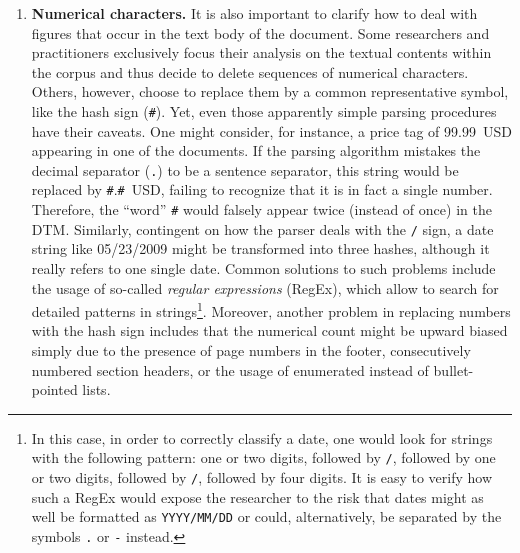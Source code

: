 \begin{enumerate}[(1)]
\item \textbf{Numerical characters.} It is also important to clarify how to deal with figures that occur in the text body of the document. Some researchers and practitioners exclusively focus their analysis on the textual contents within the corpus and thus decide to delete sequences of numerical characters. Others, however, choose to replace them by a common representative symbol, like the hash sign (\texttt{\#}). Yet, even those apparently simple parsing procedures have their caveats. One might consider, for instance, a price tag of \mbox{\textsf{99.99 USD}} appearing in one of the documents. If the parsing algorithm mistakes the decimal separator (\texttt{.}) to be a sentence separator, this string would be replaced by \mbox{\texttt{\#}.\texttt{\#} \textsf{USD}}, failing to recognize that it is in fact a single number. Therefore, the \enquote{word} \texttt{\#} would falsely appear twice (instead of once) in the DTM. Similarly, contingent on how the parser deals with the \texttt{/} sign, a date string like \textsf{05/23/2009} might be transformed into three hashes, although it really refers to one single date. Common solutions to such problems include the usage of so-called \emph{regular expressions} (RegEx), which allow to search for detailed patterns in strings\footnote{In this case, in order to correctly classify a date, one would look for strings with the following pattern: one or two digits, followed by \texttt{/}, followed by one or two digits, followed by \texttt{/}, followed by four digits. It is easy to verify how such a RegEx would expose the researcher to the risk that dates might as well be formatted as \texttt{YYYY/MM/DD} or could, alternatively, be separated by the symbols \texttt{.} or \texttt{-} instead.}. Moreover, another problem in replacing numbers with the hash sign includes that the numerical count might be upward biased simply due to the presence of page numbers in the footer, consecutively numbered section headers, or the usage of enumerated instead of bullet-pointed lists. 
\end{enumerate}


